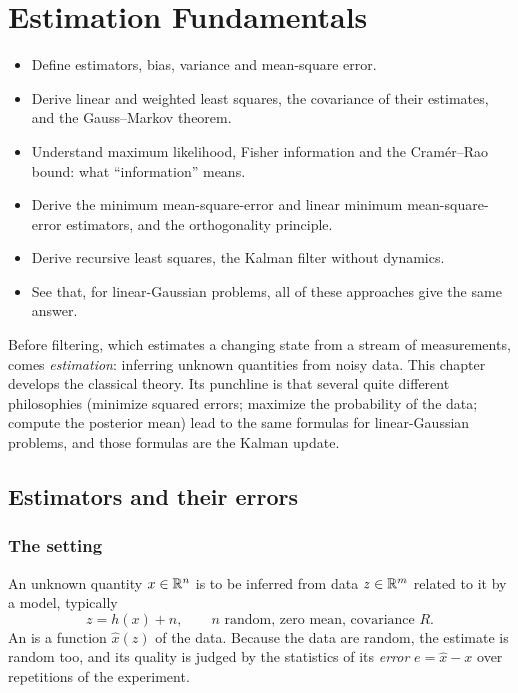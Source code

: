 \chapter{Estimation Fundamentals}
\label{ch:estimation}

\begin{objectives}
\begin{itemize}
  \item Define estimators, bias, variance and mean-square error.
  \item Derive linear and weighted least squares, the covariance of their estimates, and the Gauss--Markov theorem.
  \item Understand maximum likelihood, Fisher information and the Cram\'er--Rao bound: what ``information'' means.
  \item Derive the minimum mean-square-error and linear minimum mean-square-error estimators, and the orthogonality principle.
  \item Derive recursive least squares, the Kalman filter without dynamics.
  \item See that, for linear-Gaussian problems, all of these approaches give the same answer.
\end{itemize}
\end{objectives}

Before filtering, which estimates a changing state from a stream of measurements, comes \emph{estimation}: inferring unknown quantities
from noisy data. This chapter develops the classical theory. Its punchline is that several quite different philosophies (minimize squared
errors; maximize the probability of the data; compute the posterior mean) lead to the same formulas for linear-Gaussian problems, and those
formulas are the Kalman update.

\section{Estimators and their errors}

\subsection{The setting}

An unknown quantity $x \in \mathbb{R}^n$ is to be inferred from data $z \in \mathbb{R}^m$ related to it by a model, typically
\begin{equation}
  z = h(x) + n, \qquad n \text{ random, zero mean, covariance } R .
\end{equation}
An  is a function $\hat x(z)$ of the data. Because the data are random, the estimate is random too, and its quality is judged
by the statistics of its \emph{error} $e = \hat x - x$ over repetitions of the experiment.


